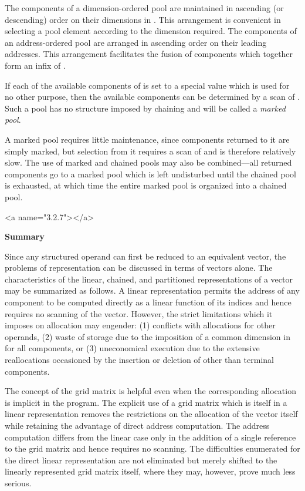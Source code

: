{\par The components of a dimension-ordered pool are maintained in ascending (or descending) order on their dimensions in \textbf{\pi}. This arrangement is convenient in selecting a pool element according to the dimension required. The components of an address-ordered pool are arranged in ascending order on their leading addresses. This arrangement facilitates the fusion of components which together form an infix of \textbf{\pi}.

\par If each of the available components of \textbf{\pi} is set to a special value which is used for no other purpose, then the available components can be determined by a scan of \textbf{\pi}. Such a pool has no structure imposed by chaining and will be called a \textit{marked pool}.

\par A marked pool requires little maintenance, since components returned to it are simply marked, but selection from it requires a scan of \textbf{\pi} and is therefore relatively slow. The use of marked and chained pools may also be combined---all returned components go to a marked pool which is left undisturbed until the chained pool is exhausted, at which time the entire marked pool is organized into a chained pool.



<a name="3.2.7"></a>
\par \textbf{Summary}

\par Since any structured operand can first be reduced to an equivalent vector, the problems of representation can be discussed in terms of vectors alone. The characteristics of the linear, chained, and partitioned representations of a vector may be summarized as follows. A linear representation permits the address of any component to be computed directly as a linear function of its indices and hence requires no scanning of the vector. However, the strict limitations which it imposes on allocation may engender: (1) conflicts with allocations for other operands, (2) waste of storage due to the imposition of a common dimension in \textbf{\pi} for all components, or (3) uneconomical execution due to the extensive reallocations occasioned by the insertion or deletion of other than terminal components.

\par The concept of the grid matrix is helpful even when the corresponding allocation is implicit in the program. The explicit use of a grid matrix which is itself in a linear representation removes the restrictions on the allocation of the vector itself while retaining the advantage of direct address computation. The address computation differs from the linear case only in the addition of a single reference to the grid matrix and hence requires no scanning. The difficulties enumerated for the direct linear representation are not eliminated but merely shifted to the linearly represented grid matrix itself, where they may, however, prove much less serious.

}

